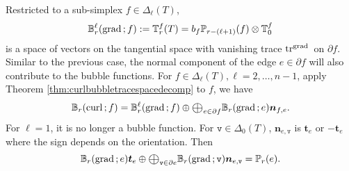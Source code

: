 \documentclass[10pt]{amsart}
\newcommand{\Oplus}{\ensuremath{\vcenter{\hbox{\scalebox{1.5}{$\oplus$}}}}}
\begin{document}
%
Restricted to a sub-simplex $f\in \Delta_{\ell}(T)$,
$$ 
\mathbb B_{r}^{\ell}({\rm grad\,}; f) := \mathbb T^f_r(T) = b_f\mathbb P_{r - (\ell +1)} (f)\otimes \mathbb T_0^f
$$ 
is a space of vectors on the tangential space with vanishing trace $\operatorname{tr}^{{\rm grad\,}}$ on $\partial f$. Similar to the previous case, the normal component of the edge $e\in \partial f$ will also contribute to the bubble functions. For  $f\in\Delta_{\ell}(T), \ell=2,\ldots, n-1$, apply Theorem \ref{thm:curlbubbletracespacedecomp} to $f$, we have
$$
\mathbb B_r(\curl; f) = \mathbb B_{r}^{\ell}(\grad; f) \oplus \Oplus_{e\in \partial f}\mathbb B_{r}(\grad; e) \boldsymbol{n}_{f,e}.
$$
For $\ell = 1$, it is no longer a bubble function. For $\texttt{v}\in\Delta_0(T)$, $\boldsymbol{n}_{e,\texttt{v}}$ is $\boldsymbol{t}_{e}$ or $-\boldsymbol{t}_{e}$ where the sign depends on the orientation. Then
$$
\mathbb B_{r}(\grad; e) \bs t_e \oplus \Oplus_{\texttt{v}\in \partial e}\mathbb B_{r}(\grad; \texttt{v}) \boldsymbol{n}_{e,\texttt{v}} = \mathbb P_{r}(e).
$$
\end{document}
